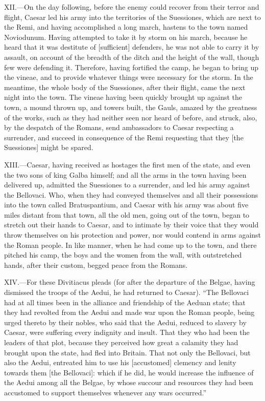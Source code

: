 XII.—On the day following, before the enemy could recover from their
terror and flight, Caesar led his army into the territories of the
Suessiones, which are next to the Remi, and having accomplished a long
march, hastens to the town named Noviodunum. Having attempted to take it
by storm on his march, because he heard that it was destitute of
[sufficient] defenders, he was not able to carry it by assault, on
account of the breadth of the ditch and the height of the wall, though
few were defending it. Therefore, having fortified the camp, he began to
bring up the vineae, and to provide whatever things were necessary for
the storm. In the meantime, the whole body of the Suessiones, after
their flight, came the next night into the town. The vineae having been
quickly brought up against the town, a mound thrown up, and towers
built, the Gauls, amazed by the greatness of the works, such as they had
neither seen nor heard of before, and struck, also, by the despatch of
the Romans, send ambassadors to Caesar respecting a surrender, and
succeed in consequence of the Remi requesting that they [the Suessiones]
might be spared.

XIII.—Caesar, having received as hostages the first men of the state,
and even the two sons of king Galba himself; and all the arms in the
town having been delivered up, admitted the Suessiones to a surrender,
and led his army against the Bellovaci. Who, when they had conveyed
themselves and all their possessions into the town called Bratuspantium,
and Caesar with his army was about five miles distant from that town,
all the old men, going out of the town, began to stretch out their hands
to Caesar, and to intimate by their voice that they would throw
themselves on his protection and power, nor would contend in arms
against the Roman people. In like manner, when he had come up to the
town, and there pitched his camp, the boys and the women from the wall,
with outstretched hands, after their custom, begged peace from the
Romans.

XIV.—For these Divitiacus pleads (for after the departure of the
Belgae, having dismissed the troops of the Aedui, he had returned to
Caesar). ``The Bellovaci had at all times been in the alliance and
friendship of the Aeduan state; that they had revolted from the Aedui
and made war upon the Roman people, being urged thereto by their nobles,
who said that the Aedui, reduced to slavery by Caesar, were suffering
every indignity and insult. That they who had been the leaders of that
plot, because they perceived how great a calamity they had brought upon
the state, had fled into Britain. That not only the Bellovaci, but also
the Aedui, entreated him to use his [accustomed] clemency and lenity
towards them [the Bellovaci]: which if he did, he would increase the
influence of the Aedui among all the Belgae, by whose succour and
resources they had been accustomed to support themselves whenever any
wars occurred.''

